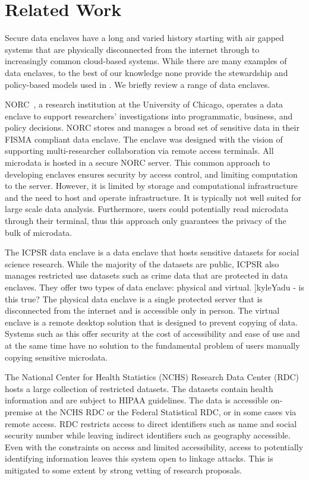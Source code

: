 \section{Related Work}

Secure data enclaves have a long and varied history starting with air gapped systems that are physically
disconnected from the internet through to increasingly common cloud-based systems.
While there are many examples of data enclaves, to the best of our knowledge none provide 
the stewardship and policy-based models used in \NAMENS. We briefly review
a range of data enclaves. 

NORC~\cite{lane2008using}, a research institution at the University of Chicago, operates a
data enclave to support researchers' investigations into programmatic, business, and policy decisions. 
NORC stores and manages a broad set of sensitive data in their FISMA compliant data enclave. The enclave
was designed with the vision of supporting multi-researcher collaboration via remote access terminals.
All microdata is hosted in a secure NORC server. 
This common approach to developing enclaves ensures security by access control, and limiting computation
to the server. However, it is limited by storage and computational infrastructure and the need to
host and operate infrastructure. It is typically not well
suited for large scale data analysis. Furthermore, users could potentially read microdata through 
their terminal, thus this approach only guarantees the privacy of the bulk of microdata.

The ICPSR data enclave \cite{icpsr} is a data enclave that hosts sensitive datasets
for social science research. While the majority of the datasets are public, ICPSR
also manages restricted use datasets such as crime
data that are protected in data enclaves. They offer two types of data enclave: physical
and virtual. ]kyle{Yadu - is this true?} The physical data enclave is a single protected server that is disconnected
from the internet and is accessible only in person. The virtual enclave is a remote desktop solution that is designed
to prevent copying of data. Systems such as this offer security at the cost of accessibility and ease of use and at
the same time have no solution to the fundamental problem of users manually copying sensitive microdata.

The National Center for Health Statistics (NCHS) Research Data Center (RDC) \cite{cdc} hosts a large collection of
restricted datasets. The datasets contain health information and are subject to HIPAA guidelines.
The data is accessible on-premise at the NCHS RDC or the Federal Statistical RDC, or in some
cases via remote access. 
RDC restricts access to direct identifiers such as name and 
social security number while leaving indirect identifiers such as geography accessible. Even with the constraints
on access and limited accessibility, access to potentially identifying information leaves this system open to
linkage attacks. This is mitigated to some extent by strong vetting of research proposals.

